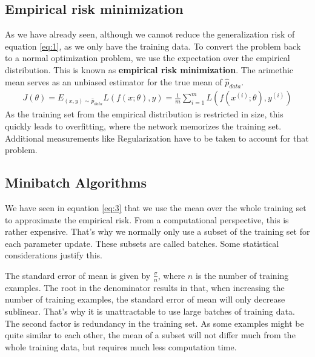 \subsection{Empirical risk minimization}\label{sub:2} As we have already seen,
although we cannot reduce the generalization risk of equation \ref{eq:1}, as we
only have the training data. To convert the problem back to a normal
optimization problem, we use the expectation over the empirical distribution.
This is known as \textbf{empirical risk minimization}. The arimethic mean
serves as an unbiased estimator for the true mean of $\hat{p}_{data}$.
\begin{align}\label{eq:3}
    J(\theta) = E_{(x,y)\sim \hat{p}_{data}} L(f(x;\theta), y) = \frac{1}{m} \sum_{i=1}^m L(f(x^{(i)}; \theta), y^{(i)})
\end{align}
As the training set from the empirical distribution is restricted in size, this
quickly leads to overfitting, where the network memorizes the training set.
Additional measurements like Regularization have to be taken to account for that
problem.

\begin{comment}
Another part in which we often optimize indirectly is the loss function
$L(f(x;\theta), y)$. Take a classification task for example. An intuitive loss
function would be the accuracy, which is computed by:
\begin{align}
    \frac{\textrm{\# of correct classifications}}{\textrm{\# of total classifications}}
\end{align}
When using this loss function with gradient descent however, this would lead to
no useful gradient as it is 0 everywhere[??]. That's why we use another loss
function like Cross-Entropy to optimize for this function indirectly.
\end{comment}

\subsection{Minibatch Algorithms}\label{sub:Minibatch}
We have seen in equation \ref{eq:3} that we use the mean over the whole training
set to approximate the empirical risk. From a computational perspective, this is
rather expensive. That's why we normally only use a subset of the training set
for each parameter update. These subsets are called batches. Some statistical
considerations justify this.

The standard error of mean is given by $\frac{\sigma}{n}$, where $n$ is the
number of training examples. The root in the denominator results in that, when
increasing the number of training examples, the standard error of mean will
only decrease sublinear. That's why it is unattractable to use large batches of
training data. The second factor is redundancy in the training set. As some
examples might be quite similar to each other, the mean of a subset will not
differ much from the whole training data, but requires much less computation
time.

